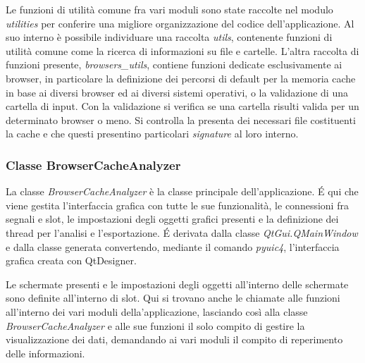 Le funzioni di utilità comune fra vari moduli sono state raccolte nel modulo \textit{utilities} per conferire una migliore organizzazione del codice dell'applicazione. 
Al suo interno è possibile individuare una raccolta \textit{utils}, contenente funzioni di utilità comune come la ricerca di informazioni su file e cartelle. 
L'altra raccolta di funzioni presente, \textit{browsers\_utils}, contiene funzioni dedicate esclusivamente ai browser, in particolare la definizione dei percorsi di default per la memoria cache in base ai diversi browser ed ai diversi sistemi operativi, o la validazione di una cartella di input. Con la validazione si verifica se una cartella risulti valida per un determinato browser o meno. Si controlla la presenta dei necessari file costituenti la cache e che questi presentino particolari \textit{signature} al loro interno.

\subsubsection{Classe BrowserCacheAnalyzer}

La classe \textit{BrowserCacheAnalyzer} è la classe principale dell'applicazione. \'E qui che viene gestita l'interfaccia grafica con tutte le sue funzionalità, le connessioni fra segnali e slot, le impostazioni degli oggetti grafici presenti e la definizione dei thread per l'analisi e l'esportazione. \'E derivata dalla classe \textit{QtGui.QMainWindow} e dalla classe generata convertendo, mediante il comando \textit{pyuic4}, l'interfaccia grafica creata con QtDesigner.

Le schermate presenti e le impostazioni degli oggetti all'interno delle schermate sono definite all'interno di slot. Qui si trovano anche le chiamate alle funzioni all'interno dei vari moduli della'applicazione, lasciando così alla classe \textit{BrowserCacheAnalyzer} e alle sue funzioni il solo compito di gestire la visualizzazione dei dati, demandando ai vari moduli il compito di reperimento delle informazioni.



